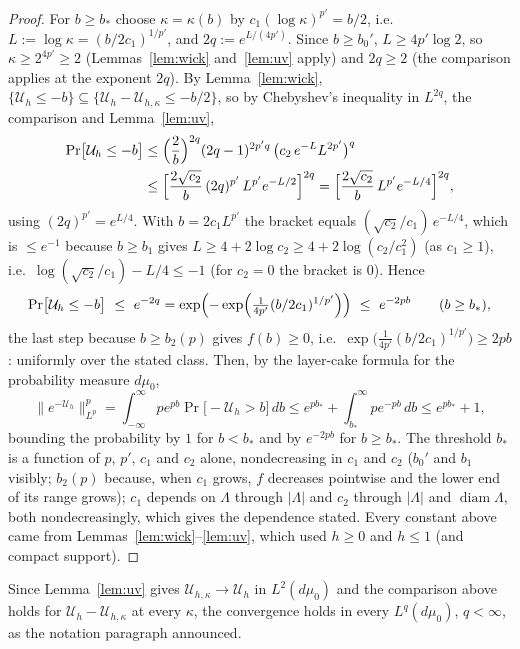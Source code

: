 \documentclass[11pt,a4paper]{article}
\theoremstyle{plain}
\theoremstyle{definition}
\theoremstyle{plain}
\theoremstyle{definition}
\begin{document}
\begin{proof}
For $b\ge b_*$ choose $\kappa=\kappa(b)$ by $c_1(\log\kappa)^{p'}=b/2$, i.e.\
$L:=\log\kappa=(b/2c_1)^{1/p'}$, and $2q:=e^{L/(4p')}$.  Since $b\ge b_0'$, $L\ge4p'\log2$,
so $\kappa\ge2^{4p'}\ge2$ (Lemmas~\ref{lem:wick} and~\ref{lem:uv} apply) and $2q\ge2$ (the
comparison applies at the exponent $2q$).  By Lemma~\ref{lem:wick},
$\{\mathcal U_h\le-b\}\subseteq\{\mathcal U_h-\mathcal U_{h,\kappa}\le-b/2\}$, so by
Chebyshev's inequality in $L^{2q}$, the comparison and Lemma~\ref{lem:uv},
\begin{align*}
  \Pr\bigl[\mathcal U_h\le-b\bigr]
  &\le\Bigl(\frac2b\Bigr)^{2q}(2q-1)^{2p'q}\,\bigl(c_2\,e^{-L}L^{2p'}\bigr)^{q}\\
  &\le\Bigl[\frac{2\sqrt{c_2}}{b}\,(2q)^{p'}\,L^{p'}e^{-L/2}\Bigr]^{2q}
  =\Bigl[\frac{2\sqrt{c_2}}{b}\,L^{p'}e^{-L/4}\Bigr]^{2q},
\end{align*}
using $(2q)^{p'}=e^{L/4}$.  With $b=2c_1L^{p'}$ the bracket equals
$(\sqrt{c_2}/c_1)\,e^{-L/4}$, which is $\le e^{-1}$ because $b\ge b_1$ gives
$L\ge4+2\log c_2\ge4+2\log(c_2/c_1^2)$ (as $c_1\ge1$), i.e.\ $\log(\sqrt{c_2}/c_1)-L/4\le-1$
(for $c_2=0$ the bracket is $0$).  Hence
\[
  \Pr\bigl[\mathcal U_h\le-b\bigr]\ \le\ e^{-2q}
  =\exp\Bigl(-\exp\Bigl(\tfrac1{4p'}(b/2c_1)^{1/p'}\Bigr)\Bigr)\ \le\ e^{-2pb}
  \qquad(b\ge b_*),
\]
the last step because $b\ge b_2(p)$ gives $f(b)\ge0$, i.e.\
$\exp\bigl(\frac1{4p'}(b/2c_1)^{1/p'}\bigr)\ge2pb$: uniformly over the stated class.  Then,
by the layer-cake formula for the probability measure $d\mu_0$,
\[
  \|e^{-\mathcal U_h}\|_{L^p}^p
  =\int_{-\infty}^\infty pe^{pb}\Pr\bigl[-\mathcal U_h>b\bigr]\,db
  \le e^{pb_*}+\int_{b_*}^\infty pe^{-pb}\,db\le e^{pb_*}+1 ,
\]
bounding the probability by $1$ for $b<b_*$ and by $e^{-2pb}$ for $b\ge b_*$.  The
threshold $b_*$ is a function of $p$, $p'$, $c_1$ and $c_2$ alone, nondecreasing in $c_1$ and
$c_2$ ($b_0'$ and $b_1$ visibly; $b_2(p)$ because, when $c_1$ grows, $f$ decreases pointwise and
the lower end of its range grows); $c_1$ depends on $\Lambda$ through $|\Lambda|$ and $c_2$
through $|\Lambda|$ and $\operatorname{diam}\Lambda$, both nondecreasingly, which gives the
dependence stated.  Every constant above came from
Lemmas~\ref{lem:wick}--\ref{lem:uv}, which used $h\ge0$ and $h\le1$ (and compact support).
\end{proof}

Since Lemma~\ref{lem:uv} gives $\mathcal U_{h,\kappa}\to\mathcal U_h$ in $L^2(d\mu_0)$ and
the comparison above holds for $\mathcal U_h-\mathcal U_{h,\kappa}$ at every $\kappa$, the
convergence holds in every $L^q(d\mu_0)$, $q<\infty$, as the notation paragraph announced.
\end{document}
